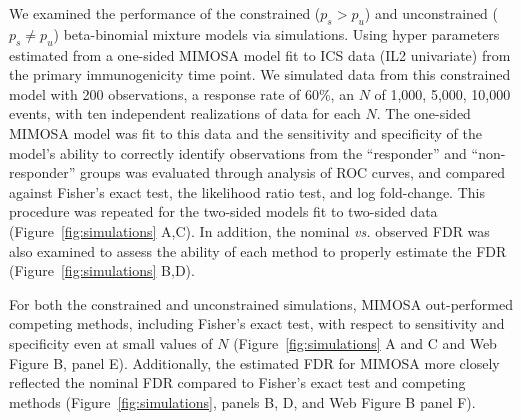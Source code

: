 \documentclass[useAMS,referee,usenatbib]{biom}
\begin{document}
We examined the performance of the constrained ($p_s>p_u$) and unconstrained ($p_s \ne p_u$) beta-binomial mixture models via simulations. Using hyper parameters estimated from a one-sided MIMOSA model fit to ICS data (IL2 univariate) from the primary immunogenicity time point. We simulated data from this constrained model with 200 observations, a response rate of 60\%, an $N$ of 1,000, 5,000, 10,000 events, with ten independent realizations of data for each $N$. The one-sided MIMOSA model was fit to this data and the sensitivity and specificity of the model's ability to correctly identify observations from the ``responder'' and ``non-responder'' groups was evaluated through analysis of ROC curves, and compared against Fisher's exact test, the likelihood ratio test, and log fold-change. This procedure was repeated for the two-sided models fit to two-sided data (Figure~\ref{fig:simulations} A,C). In addition, the nominal \textit{vs.} observed FDR was also examined to assess the ability of each method to properly estimate the FDR (Figure~\ref{fig:simulations} B,D). 

For both the constrained and unconstrained simulations, MIMOSA out-performed competing methods, including Fisher's exact test, with respect to sensitivity and specificity even at small values of $N$ (Figure~\ref{fig:simulations} A and C and Web Figure B, panel E). Additionally, the estimated FDR for MIMOSA more closely reflected the nominal FDR compared to Fisher's exact test and competing methods (Figure~\ref{fig:simulations}, panels B, D, and Web Figure B panel F). 
\end{document}
